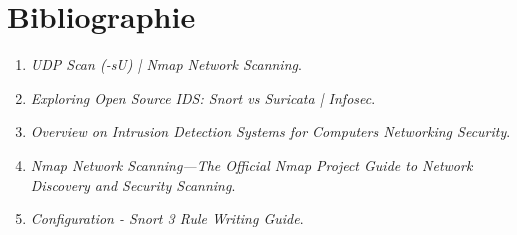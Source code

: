 \clearpage
\section*{Bibliographie}
\begin{enumerate}
\item \emph{UDP Scan (-sU) | Nmap Network Scanning}.
\item \emph{Exploring Open Source IDS: Snort vs Suricata | Infosec}.
\item \emph{Overview on Intrusion Detection Systems for Computers Networking Security}.
\item \emph{Nmap Network Scanning---The Official Nmap Project Guide to Network Discovery and Security Scanning}.
\item \emph{Configuration - Snort 3 Rule Writing Guide}.
\end{enumerate}
